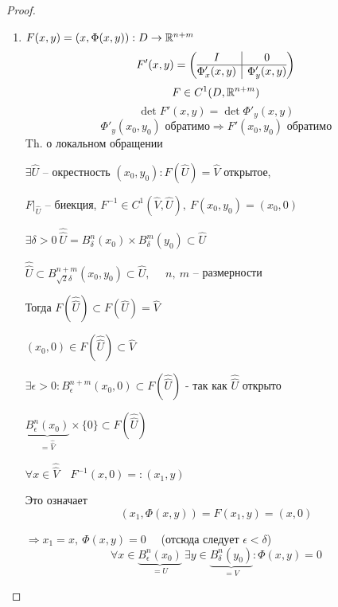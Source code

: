     \begin{proof}
        $ $
        \begin{enumerate}
            \item $F(x, y) = (x, \Phi(x, y)) : D \rightarrow \mathbb{R}^{n + m}$
                \[
                    F'(x, y) = \left(\begin{array}{@{}c|c@{}}
                        I & 0 \\
                        \hline
                        \Phi'_x(x, y) & \Phi'_y(x, y)
                      \end{array}\right)  
                \]
                \[
                      F \in C^1(D, \mathbb{R}^{n+m})
                \]
                \[
                      \det F'(x, y) = \det \Phi'_y(x, y)
                \]
                \[
                      \Phi'_y(x_0, y_0) \text{ обратимо} \Rightarrow F'(x_0, y_0) \text{ обратимо}
                \]
                Th. о локальном обращении
                \par $\exists \hat U$ -- окрестность $(x_0, y_0) : F(\hat U) = \hat V$ открытое,
                \par $F\big|_{\hat U}$ -- биекция, $F^{-1} \in C^1(\hat V, \hat U), \ F(x_0, y_0) = (x_0, 0)$
                \par $\exists \delta > 0 \ \hat{\hat U} = B_\delta^n(x_0) \times B_\delta^m(y_0) \subset \hat U$
                \par $\hat{\hat U} \subset B_{\sqrt{2}\delta}^{n + m}(x_0, y_0) \subset \hat{U}, \quad$ $n, \ m$ -- размерности
                \par Тогда $F(\hat{\hat U}) \subset F(\hat U) = \hat V$
                \par $(x_0, 0) \in F(\hat{\hat U}) \subset \hat V$
                \par $\exists \epsilon > 0 : B_\epsilon^{n+m}(x_0, 0) \subset F(\hat {\hat U})$ - так как $\hat {\hat U} $ открыто
                \par $\underbrace{B^n_\epsilon(x_0)}_{= \hat{\hat V}} \times \{0\} \subset F(\hat{\hat U})$
                \par $\forall x \in \hat{\hat V} \quad F^{-1}(x, 0) =: (x_1, y)$
                \par Это означает
                \[
                      (x_1, \Phi(x, y)) = F(x_1, y) = (x, 0)
                \]
                \par $\Rightarrow x_1 = x, \ \Phi(x, y) = 0 \quad$ (отсюда следует $\epsilon < \delta$)
                \[
                      \forall x \in \underbrace{B_\epsilon^n(x_0)}_{= U} \ \exists y \in \underbrace{B_\delta^n(y_0)}_{= V} : \Phi(x, y) = 0
\]
\end{enumerate}
\end{proof}
